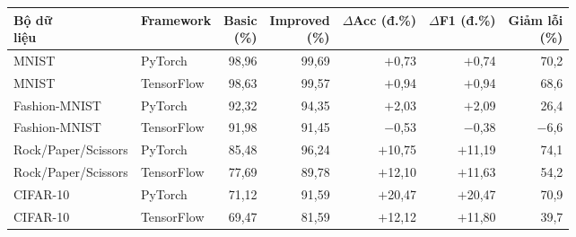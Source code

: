 \begin{tabular}{llrrrrr}
\toprule
\makecell[l]{Bộ dữ\\liệu} & Framework & \makecell[r]{Basic\\(\%)} & \makecell[r]{Improved\\(\%)} & $\Delta$Acc (đ.\%) & $\Delta$F1 (đ.\%) & \makecell[r]{Giảm lỗi\\(\%)} \\
\midrule
MNIST & PyTorch & 98{,}96 & 99{,}69 & \ensuremath{+}0{,}73 & \ensuremath{+}0{,}74 & 70{,}2 \\
MNIST & TensorFlow & 98{,}63 & 99{,}57 & \ensuremath{+}0{,}94 & \ensuremath{+}0{,}94 & 68{,}6 \\
Fashion-MNIST & PyTorch & 92{,}32 & 94{,}35 & \ensuremath{+}2{,}03 & \ensuremath{+}2{,}09 & 26{,}4 \\
Fashion-MNIST & TensorFlow & 91{,}98 & 91{,}45 & \ensuremath{-}0{,}53 & \ensuremath{-}0{,}38 & \ensuremath{-}6{,}6 \\
Rock/Paper/Scissors & PyTorch & 85{,}48 & 96{,}24 & \ensuremath{+}10{,}75 & \ensuremath{+}11{,}19 & 74{,}1 \\
Rock/Paper/Scissors & TensorFlow & 77{,}69 & 89{,}78 & \ensuremath{+}12{,}10 & \ensuremath{+}11{,}63 & 54{,}2 \\
CIFAR-10 & PyTorch & 71{,}12 & 91{,}59 & \ensuremath{+}20{,}47 & \ensuremath{+}20{,}47 & 70{,}9 \\
CIFAR-10 & TensorFlow & 69{,}47 & 81{,}59 & \ensuremath{+}12{,}12 & \ensuremath{+}11{,}80 & 39{,}7 \\
\bottomrule
\end{tabular}
